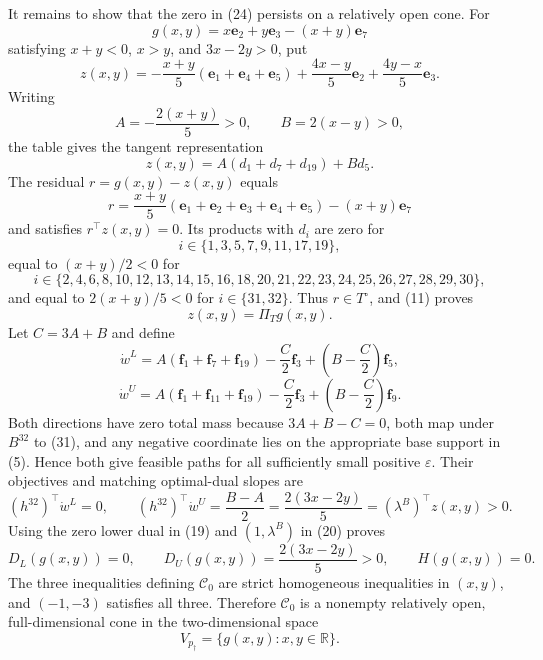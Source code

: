 It remains to show that the zero in (24) persists on a relatively open cone.  For
\[
g(x,y)=x\mathbf e_2+y\mathbf e_3-(x+y)\mathbf e_7
\]
satisfying \(x+y<0\), \(x>y\), and \(3x-2y>0\), put
\[
z(x,y)=-\frac{x+y}{5}(\mathbf e_1+\mathbf e_4+\mathbf e_5)
+\frac{4x-y}{5}\mathbf e_2+\frac{4y-x}{5}\mathbf e_3.
\tag{29}
\]
Writing
\[
A=-\frac{2(x+y)}5>0,
\qquad
B=2(x-y)>0,
\tag{30}
\]
the table gives the tangent representation
\[
z(x,y)=A(d_1+d_7+d_{19})+Bd_5.
\tag{31}
\]
The residual \(r=g(x,y)-z(x,y)\) equals
\[
r=\frac{x+y}{5}(\mathbf e_1+\mathbf e_2+\mathbf e_3+\mathbf e_4+\mathbf e_5)
-(x+y)\mathbf e_7
\tag{32}
\]
and satisfies \(r^\top z(x,y)=0\).  Its products with \(d_i\) are zero for
\[
i\in\{1,3,5,7,9,11,17,19\},
\]
equal to \((x+y)/2<0\) for
\[
i\in\{2,4,6,8,10,12,13,14,15,16,18,20,21,22,23,24,25,26,27,28,29,30\},
\]
and equal to \(2(x+y)/5<0\) for \(i\in\{31,32\}\).  Thus \(r\in T^\circ\), and (11) proves
\[
z(x,y)=\Pi_Tg(x,y).
\tag{33}
\]
Let \(C=3A+B\) and define
\[
\dot w^L=A(\mathbf f_1+\mathbf f_7+\mathbf f_{19})
-\frac C2\mathbf f_3+\left(B-\frac C2\right)\mathbf f_5,
\tag{34}
\]
\[
\dot w^U=A(\mathbf f_1+\mathbf f_{11}+\mathbf f_{19})
-\frac C2\mathbf f_3+\left(B-\frac C2\right)\mathbf f_9.
\tag{35}
\]
Both directions have zero total mass because \(3A+B-C=0\), both map under \(B^{32}\) to (31), and any negative coordinate lies on the appropriate base support in (5).  Hence both give feasible paths for all sufficiently small positive \(\varepsilon\).  Their objectives and matching optimal-dual slopes are
\[
(h^{32})^\top\dot w^L=0,
\qquad
(h^{32})^\top\dot w^U=\frac{B-A}{2}
=\frac{2(3x-2y)}5
=(\lambda^B)^\top z(x,y)>0.
\tag{36}
\]
Using the zero lower dual in (19) and \((1,\lambda^B)\) in (20) proves
\[
D_L(g(x,y))=0,
\qquad
D_U(g(x,y))=\frac{2(3x-2y)}5>0,
\qquad
H(g(x,y))=0.
\tag{37}
\]
The three inequalities defining \(\mathcal C_0\) are strict homogeneous inequalities in \((x,y)\), and \((-1,-3)\) satisfies all three.  Therefore \(\mathcal C_0\) is a nonempty relatively open, full-dimensional cone in the two-dimensional space
\[
V_{p_\dagger}=\{g(x,y):x,y\in\mathbb R\}.
\tag{38}
\]

